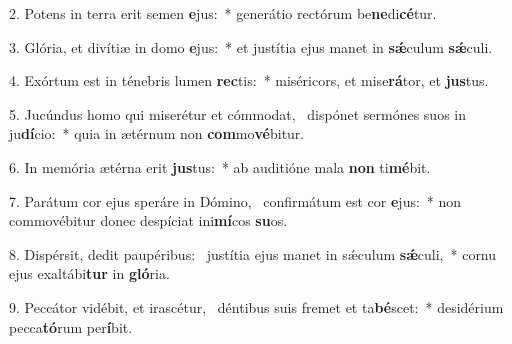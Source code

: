 2. Potens in terra erit semen \textbf{e}jus:~*  generátio rectórum be\textbf{ne}di\textbf{cé}tur.\

3. Glória, et divítiæ in domo \textbf{e}jus:~*  et justítia ejus manet in \textbf{sǽ}culum \textbf{sǽ}culi.\

4. Exórtum est in ténebris lumen \textbf{rec}tis:~*  miséricors, et mise\textbf{rá}tor, et \textbf{jus}tus.\

5. Jucúndus homo qui miserétur et cómmodat, \dag\  dispónet sermónes suos in ju\textbf{dí}cio:~*  quia in ætérnum non \textbf{com}mo\textbf{vé}bitur.\

6. In memória ætérna erit \textbf{jus}tus:~*  ab auditióne mala \textbf{non} ti\textbf{mé}bit.\

7. Parátum cor ejus speráre in Dómino, \dag\  confirmátum est cor \textbf{e}jus:~*  non commovébitur donec despíciat ini\textbf{mí}cos \textbf{su}os.\

8. Dispérsit, dedit paupéribus: \dag\  justítia ejus manet in sǽculum \textbf{sǽ}culi,~*  cornu ejus exaltábi\textbf{tur} in \textbf{gló}ria.\

9. Peccátor vidébit, et irascétur, \dag\  déntibus suis fremet et ta\textbf{bé}scet:~*  desidérium pecca\textbf{tó}rum per\textbf{í}bit.\

